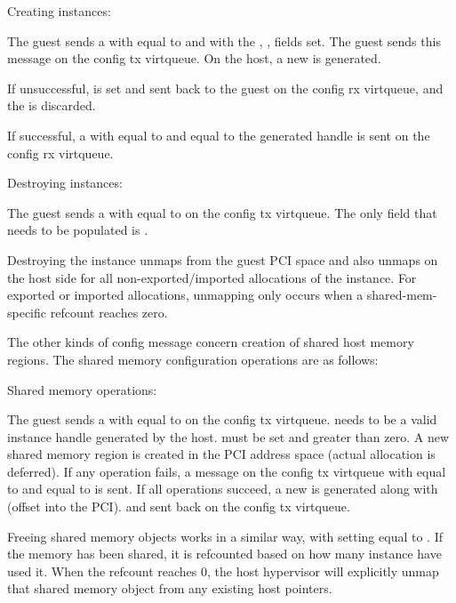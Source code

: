 Creating instances:

The guest sends a 
with  equal to 
and with the , ,  fields set.
The guest sends this message on the config tx virtqueue.
On the host, a new  is generated.

If unsuccessful,  is set and sent back to the guest
on the config rx virtqueue, and the  is discarded.

If successful, a 
with  equal to 
and  equal to the generated handle
is sent on the config rx virtqueue.

Destroying instances:

The guest sends a 
with  equal to 
on the config tx virtqueue.
The only field that needs to be populated
is .

Destroying the instance unmaps from the guest PCI space
and also unmaps on the host side
for all non-exported/imported allocations of the instance.
For exported or imported allocations, unmapping
only occurs when a shared-mem-specific refcount reaches zero.

The other kinds of config message concern creation of shared host memory regions.
The shared memory configuration operations are as follows:

Shared memory operations:

The guest sends a 
with  equal to 
on the config tx virtqueue.
 needs to be a valid instance handle generated by the host.
 must be set and greater than zero.
A new shared memory region is created in the PCI address space (actual allocation is deferred).
If any operation fails, a message on the config tx virtqueue
with  equal to 
and  equal to 
is sent.
If all operations succeed,
a new  is generated along with  (offset into the PCI).
and sent back on the config tx virtqueue.

Freeing shared memory objects works in a similar way,
with setting  equal to .
If the memory has been shared,
it is refcounted based on how many instance have used it.
When the refcount reaches 0,
the host hypervisor will explicitly unmap that shared memory object
from any existing host pointers.

